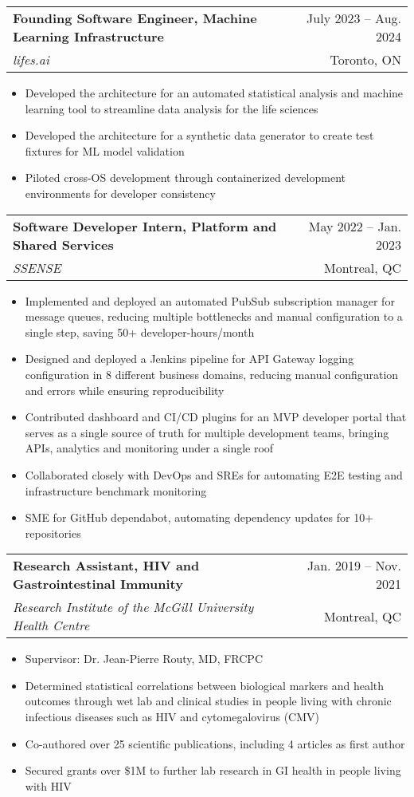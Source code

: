 \documentclass[letterpaper,11pt]{article}
\makeatletter
\newcommand{\resumeItem}[1]{
  \item\small{
    {#1 \vspace{-2pt}}
  }
}
\newcommand{\resumeSubheading}[4]{
  \vspace{-2pt}\item
    \begin{tabular*}{0.97\textwidth}[t]{l@{\extracolsep{\fill}}r}
      \textbf{#1} & #2 \\
      \textit{\small#3} & \small #4 \\
    \end{tabular*}\vspace{-7pt}
}
\newcommand{\resumeSubSubheading}[2]{
    \item
    \begin{tabular*}{0.97\textwidth}{l@{\extracolsep{\fill}}r}
      \textit{\small#1} & \small #2 \\
    \end{tabular*}\vspace{-7pt}
}
\newcommand{\resumeSubHeadingListEnd}{\end{itemize}}
\newcommand{\resumeItemListStart}{\begin{itemize}}
\newcommand{\resumeItemListEnd}{\end{itemize}\vspace{-5pt}}
\makeatother
\begin{document}

    \resumeSubheading
      {Founding Software Engineer, Machine Learning Infrastructure}{July 2023 -- Aug. 2024}
      {lifes.ai}{Toronto, ON}
      \resumeItemListStart
        \resumeItem{Developed the architecture for an automated statistical analysis and machine learning tool to streamline data analysis for the life sciences}
        \resumeItem{Developed the architecture for a synthetic data generator to create test fixtures for ML model validation}
        \resumeItem{Piloted cross-OS development through containerized development environments for developer consistency}
    \resumeItemListEnd

    \resumeSubheading
      {Software Developer Intern, Platform and Shared Services}{May 2022 -- Jan. 2023}
      {SSENSE}{Montreal, QC}
      \resumeItemListStart
        \resumeItem{Implemented and deployed an automated PubSub subscription manager for message queues, reducing multiple bottlenecks and manual configuration to a single step, saving 50+ developer-hours/month}
        \resumeItem{Designed and deployed a Jenkins pipeline for API Gateway logging configuration in 8 different business domains, reducing manual configuration and errors while ensuring reproducibility}
        \resumeItem{Contributed dashboard and CI/CD plugins for an MVP developer portal that serves as a single source of truth for multiple development teams, bringing APIs, analytics and monitoring under a single roof}
        \resumeItem{Collaborated closely with DevOps and SREs for automating E2E testing and infrastructure benchmark monitoring}
        \resumeItem{SME for GitHub dependabot, automating dependency updates for 10+ repositories}
      \resumeItemListEnd
    
    \resumeSubheading
      {Research Assistant, HIV and Gastrointestinal Immunity}{Jan. 2019 -- Nov. 2021}
      {Research Institute of the McGill University Health Centre}{Montreal, QC}
      \resumeItemListStart
        \resumeItem{Supervisor: Dr. Jean-Pierre Routy, MD, FRCPC}
        \resumeItem{Determined statistical correlations between biological markers and health outcomes through wet lab and clinical studies in people living with chronic infectious diseases such as HIV and cytomegalovirus (CMV)}
        \resumeItem{Co-authored over 25 scientific publications, including 4 articles as first author}
        \resumeItem{Secured grants over \$1M to further lab research in GI health in people living with HIV}
      \resumeItemListEnd
      
\end{document}
